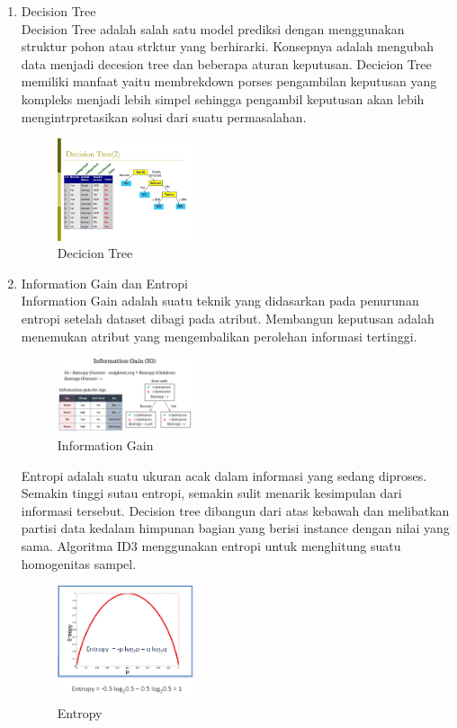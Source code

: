 \begin{enumerate}
\item Decision Tree \\
Decision Tree adalah salah satu model prediksi dengan menggunakan struktur pohon atau strktur yang berhirarki. Konsepnya adalah mengubah data menjadi decesion tree dan beberapa aturan keputusan. Decicion Tree memiliki manfaat yaitu membrekdown porses pengambilan keputusan yang kompleks menjadi lebih simpel sehingga pengambil keputusan akan lebih mengintrpretasikan solusi dari suatu permasalahan.
\begin{figure}[H]
		\includegraphics[width=4cm]{figures/1174054/2/decision.jpg}
		\centering
		\caption{Decicion Tree}
\end{figure}

\item Information Gain dan Entropi\\
Information Gain adalah suatu teknik yang didasarkan pada penurunan entropi setelah dataset dibagi pada atribut. Membangun keputusan adalah menemukan atribut yang mengembalikan perolehan informasi tertinggi.
\begin{figure}[H]
		\includegraphics[width=4cm]{figures/1174054/2/information.png}
		\centering
		\caption{Information Gain}
\end{figure}

Entropi adalah suatu ukuran acak dalam informasi yang sedang diproses. Semakin tinggi sutau entropi, semakin sulit menarik kesimpulan dari informasi tersebut. Decision tree dibangun dari atas kebawah dan melibatkan partisi data kedalam himpunan bagian yang berisi instance dengan nilai yang sama. Algoritma ID3 menggunakan entropi untuk menghitung suatu homogenitas sampel. 
\begin{figure}[H]
		\includegraphics[width=4cm]{figures/1174054/2/entropy.png}
		\centering
		\caption{Entropy}
\end{figure}
\end{enumerate}

